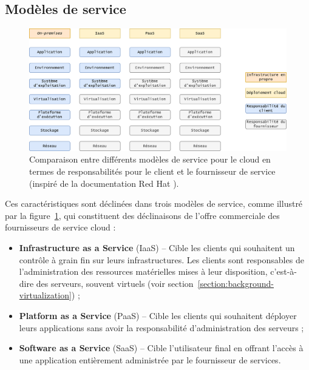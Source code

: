 \subsection{Modèles de service}

\begin{figure}[!ht]
    \centering
	\includegraphics[width=\textwidth]{2_Chapitre2/figures/service-models.png}
	\caption[Comparaison entre différents modèles de service pour le cloud en termes de responsabilités pour le client et le fournisseur de service.]{Comparaison entre différents modèles de service pour le cloud en termes de responsabilités pour le client et le fournisseur de service (inspiré de la documentation Red Hat \protect \footnotemark).}
	\label{figure:context-service-model}
\end{figure}


Ces caractéristiques sont déclinées dans trois modèles de service, comme illustré par la figure~\ref{figure:context-service-model}, qui constituent des déclinaisons de l'offre commerciale des fournisseurs de service cloud :

\begin{itemize}
    \item \textbf{Infrastructure as a Service} (\gls{IaaS}) -- Cible les clients qui souhaitent un contrôle à grain fin sur leurs infrastructures. Les clients sont responsables de l'administration des ressources matérielles mises à leur disposition, c'est-à-dire des serveurs, souvent virtuels (voir section~\ref{section:background-virtualization}) ;
    \item \textbf{Platform as a Service} (\gls{PaaS}) -- Cible les clients qui souhaitent déployer leurs applications sans avoir la responsabilité d'administration des serveurs ;
    \item \textbf{Software as a Service} (\gls{SaaS}) -- Cible l'utilisateur final en offrant l'accès à une application entièrement administrée par le fournisseur de services.
\end{itemize}

